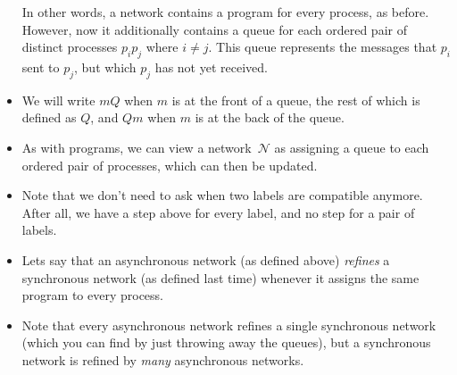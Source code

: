 \documentclass{lecturenotes}
\newcommand{\senda}[2]{#1 \rightsquigarrow #2}
\newcommand{\recva}[2]{#1 \leftsquigarrow #2}
\newcommand{\choosea}[2]{[#1] \rightsquigarrow #2}
\newcommand{\letchoosea}[2]{[#1] \leftsquigarrow #2}
\begin{document}
\begin{itemize}
\begin{syntax}
  \end{syntax}
  In other words, a network contains a program for every process, as before.
  However, now it additionally contains a queue for each ordered pair of distinct processes $p_i p_j$ where $i \neq j$.
  This queue represents the messages that $p_i$ sent to $p_j$, but which $p_j$ has not yet received.
\item We will write $m Q$ when $m$ is at the front of a queue, the rest of which is defined as $Q$, and $Q m$ when $m$ is at the back of the queue.
\item As with programs, we can view a network~$\mathcal{N}$ as assigning a queue to each ordered pair of processes, which can then be updated.
\end{itemize}


\begin{itemize}
\item Note that we don't need to ask when two labels are compatible anymore.
  After all, we have a step above for every label, and no step for a pair of labels.
\item Lets say that an asynchronous network (as defined above) \emph{refines} a synchronous network (as defined last time) whenever it assigns the same program to every process.
\item Note that every asynchronous network refines a single synchronous network (which you can find by just throwing away the queues), but a synchronous network is refined by \emph{many} asynchronous networks.
\end{itemize}
\end{document}
